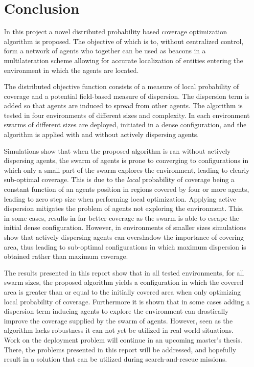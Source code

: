 \section{Conclusion}
In this project a novel distributed probability based coverage optimization algorithm is proposed. The objective of which
is to, without centralized control, form a network of agents who together can be used as beacons in a 
multilateration scheme allowing for accurate localization of entities entering the environment in which the agents are located.

The distributed objective function consists of a measure of local probability of coverage and a potential field-based measure
of dispersion. The dispersion term is added so that agents are induced to spread from other agents.
The algorithm is tested in four environments of different sizes and complexity. In each environment swarms of different sizes
are deployed, initiated in a dense configuration, and the algorithm is applied with and without actively dispersing agents.

Simulations show that when the proposed algorithm is ran without actively dispersing agents, the swarm of agents
is prone to converging to configurations in which only a small part of the swarm explores the environment, leading to 
clearly sub-optimal coverage. 
This is due to the \textit{local} probability of coverage being a constant function of an agents position in regions covered by four or more agents, 
leading to zero step size when performing local optimization.
Applying active dispersion mitigates the problem of agents not exploring the environment. This, in some cases, results in far better 
coverage as the swarm is able to escape the initial dense configuration.
However, in environments of smaller sizes simulations show that actively dispersing agents can overshadow the importance of covering area, thus 
leading to sub-optimal configurations in which maximum dispersion is obtained rather than maximum coverage.

The results presented in this report show that in all tested environments, for all swarm sizes, the proposed algorithm yields
a configuration in which the covered area is greater than or equal to the initially covered area when only optimizing local probability of coverage. 
Furthermore it is shown that in some cases adding a dispersion term inducing agents to explore the environment can drastically improve the coverage supplied
by the swarm of agents. However, seen as the algorithm lacks robustness it can not yet be utilized in real world situations. Work on the deployment problem
will continue in an upcoming master's thesis. There, the problems presented in this report will be addressed, and hopefully result in a solution that can
be utilized during search-and-rescue missions.